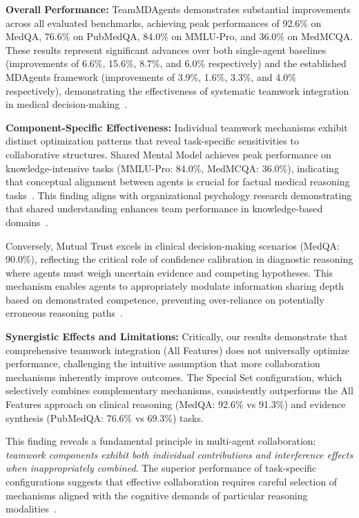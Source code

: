 \documentclass[letterpaper]{article} %
\begin{document}
\textbf{Overall Performance:} TeamMDAgents demonstrates substantial improvements across all evaluated benchmarks, achieving peak performances of 92.6\% on MedQA, 76.6\% on PubMedQA, 84.0\% on MMLU-Pro, and 36.0\% on MedMCQA. These results represent significant advances over both single-agent baselines (improvements of 6.6\%, 15.6\%, 8.7\%, and 6.0\% respectively) and the established MDAgents framework (improvements of 3.9\%, 1.6\%, 3.3\%, and 4.0\% respectively), demonstrating the effectiveness of systematic teamwork integration in medical decision-making~\citep{kim2024mdagents}.

\textbf{Component-Specific Effectiveness:} Individual teamwork mechanisms exhibit distinct optimization patterns that reveal task-specific sensitivities to collaborative structures. Shared Mental Model achieves peak performance on knowledge-intensive tasks (MMLU-Pro: 84.0\%, MedMCQA: 36.0\%), indicating that conceptual alignment between agents is crucial for factual medical reasoning tasks~\citep{salas2005big}. This finding aligns with organizational psychology research demonstrating that shared understanding enhances team performance in knowledge-based domains~\citep{cannon1995team}.

Conversely, Mutual Trust excels in clinical decision-making scenarios (MedQA: 90.0\%), reflecting the critical role of confidence calibration in diagnostic reasoning where agents must weigh uncertain evidence and competing hypotheses. This mechanism enables agents to appropriately modulate information sharing depth based on demonstrated competence, preventing over-reliance on potentially erroneous reasoning paths~\citep{webber2002trust}.

\textbf{Synergistic Effects and Limitations:} Critically, our results demonstrate that comprehensive teamwork integration (All Features) does not universally optimize performance, challenging the intuitive assumption that more collaboration mechanisms inherently improve outcomes. The Special Set configuration, which selectively combines complementary mechanisms, consistently outperforms the All Features approach on clinical reasoning (MedQA: 92.6\% vs 91.3\%) and evidence synthesis (PubMedQA: 76.6\% vs 69.3\%) tasks.

This finding reveals a fundamental principle in multi-agent collaboration: \textit{teamwork components exhibit both individual contributions and interference effects when inappropriately combined}. The superior performance of task-specific configurations suggests that effective collaboration requires careful selection of mechanisms aligned with the cognitive demands of particular reasoning modalities~\citep{marks2001temporally}.
\end{document}
